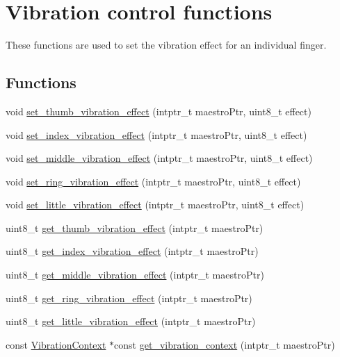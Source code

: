 \hypertarget{group__vibration_control}{}\section{Vibration control functions}
\label{group__vibration_control}


These functions are used to set the vibration effect for an individual finger.  


\subsection*{Functions}
\begin{DoxyCompactItemize}
\item 
void \hyperlink{group__vibration_control_ga2cade8fb792cc25e14176898ba9b70d5}{set\+\_\+thumb\+\_\+vibration\+\_\+effect} (intptr\+\_\+t maestro\+Ptr, uint8\+\_\+t effect)
\item 
void \hyperlink{group__vibration_control_ga1574bdd826660ba522e6a9e527b912d5}{set\+\_\+index\+\_\+vibration\+\_\+effect} (intptr\+\_\+t maestro\+Ptr, uint8\+\_\+t effect)
\item 
void \hyperlink{group__vibration_control_gac5e818c55bae4cc053575cf56da645f6}{set\+\_\+middle\+\_\+vibration\+\_\+effect} (intptr\+\_\+t maestro\+Ptr, uint8\+\_\+t effect)
\item 
void \hyperlink{group__vibration_control_ga8fbe7c8a6e2d9566023c31d0da891d74}{set\+\_\+ring\+\_\+vibration\+\_\+effect} (intptr\+\_\+t maestro\+Ptr, uint8\+\_\+t effect)
\item 
void \hyperlink{group__vibration_control_gacfdcd1bab70eb2248b3e94c7653516f2}{set\+\_\+little\+\_\+vibration\+\_\+effect} (intptr\+\_\+t maestro\+Ptr, uint8\+\_\+t effect)
\item 
uint8\+\_\+t \hyperlink{group__vibration_control_ga113a34ad762dbc4a4b033f81b0b11a65}{get\+\_\+thumb\+\_\+vibration\+\_\+effect} (intptr\+\_\+t maestro\+Ptr)
\item 
uint8\+\_\+t \hyperlink{group__vibration_control_ga4902e5e4253a07ab5b123a714f2bff0c}{get\+\_\+index\+\_\+vibration\+\_\+effect} (intptr\+\_\+t maestro\+Ptr)
\item 
uint8\+\_\+t \hyperlink{group__vibration_control_ga3d474e4b3c72158eff250da56a814472}{get\+\_\+middle\+\_\+vibration\+\_\+effect} (intptr\+\_\+t maestro\+Ptr)
\item 
uint8\+\_\+t \hyperlink{group__vibration_control_gab5ed06d83c3322a2b98d1ecc9ccbd210}{get\+\_\+ring\+\_\+vibration\+\_\+effect} (intptr\+\_\+t maestro\+Ptr)
\item 
uint8\+\_\+t \hyperlink{group__vibration_control_gab0516e0a1963f208e192e24f64dde42e}{get\+\_\+little\+\_\+vibration\+\_\+effect} (intptr\+\_\+t maestro\+Ptr)
\item 
const \hyperlink{struct_vibration_context}{Vibration\+Context} $\ast$const \hyperlink{group__vibration_control_ga578e2f96e86827fd32c9e8e181cf4c64}{get\+\_\+vibration\+\_\+context} (intptr\+\_\+t maestro\+Ptr)
\end{DoxyCompactItemize}


